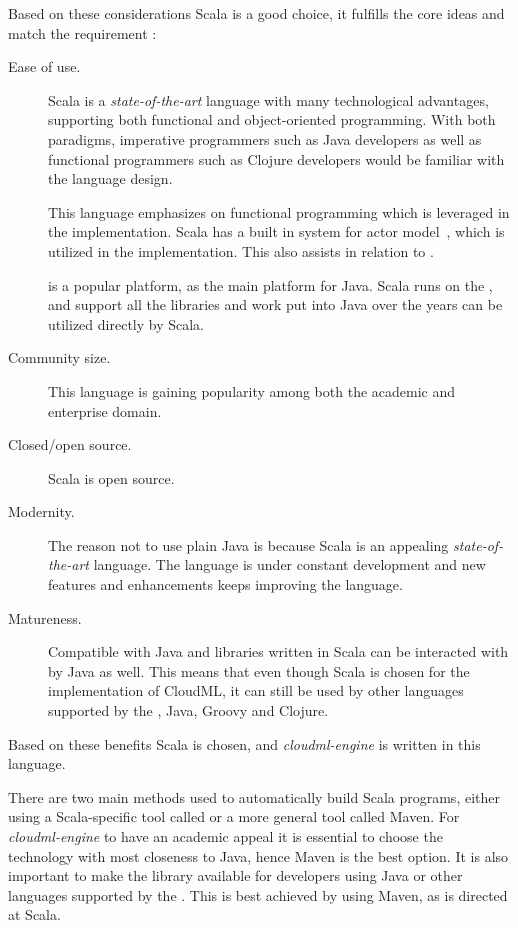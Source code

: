 Based on these considerations Scala is a good choice, it fulfills the core ideas and match
the requirement :
\begin{description} 
  \item[Ease of use.]
    Scala is a \emph{state-of-the-art} language with many technological advantages,
    \eg supporting both functional and object-oriented programming.
    With both paradigms, imperative programmers such as Java developers as well as functional
    programmers such as Clojure developers would be familiar with the language design.
    
    This language emphasizes on functional programming which is leveraged in the implementation.
    Scala has a built in system for actor model~\cite{actors:haller07}, 
    which is utilized in the implementation.
    This also assists in relation to .

     is a popular platform, as the main platform for Java.
    Scala runs on the , and support all the libraries and work put into Java
    over the years can be utilized directly by Scala.
  \item[Community size.]
    This language is gaining popularity among both the academic and enterprise domain.
  \item[Closed/open source.] Scala is open source.
  \item[Modernity.]
    The reason not to use plain Java is because Scala is an appealing \emph{state-of-the-art} language.
    The language is under constant development and new features and enhancements keeps improving
    the language.
  \item[Matureness.]
    Compatible with Java and libraries written in Scala can be interacted with by Java as well.
    This means that even though Scala is chosen for the implementation of CloudML,
    it can still be used by other languages supported by the ,
    \eg Java, Groovy and Clojure.
\end{description}
Based on these benefits Scala is chosen, and \emph{cloudml-engine} is written in this language.





There are two main methods used to automatically build Scala programs, 
either using a Scala-specific tool called  or a more general tool called Maven. 
For \emph{cloudml-engine} to have an academic appeal it is essential to choose the technology
with most closeness to Java, hence Maven is the best option.
It is also important to make the library available for developers using Java or other
languages supported by the .
This is best achieved by using Maven, as  is directed at Scala.

